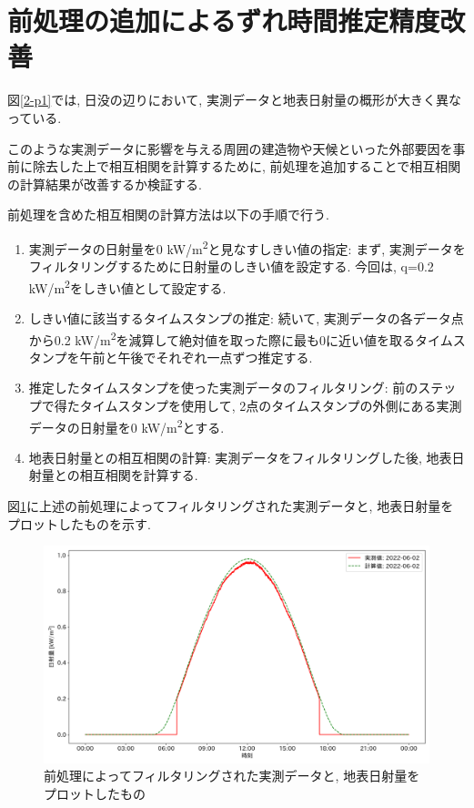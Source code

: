 \section{前処理の追加によるずれ時間推定精度改善}

図\ref{2-p1}では, 日没の辺りにおいて, 実測データと地表日射量の概形が大きく異なっている.

このような実測データに影響を与える周囲の建造物や天候といった外部要因を事前に除去した上で相互相関を計算するために, 前処理を追加することで相互相関の計算結果が改善するか検証する.

前処理を含めた相互相関の計算方法は以下の手順で行う.

\begin{enumerate}
  \item 実測データの日射量を0 \si{\kilo\watt}/\si{\metre\squared}と見なすしきい値の指定: まず, 実測データをフィルタリングするために日射量のしきい値を設定する. 今回は, q=0.2 \si{\kilo\watt}/\si{\metre\squared}をしきい値として設定する.
  \item しきい値に該当するタイムスタンプの推定: 続いて, 実測データの各データ点から0.2 \si{\kilo\watt}/\si{\metre\squared}を減算して絶対値を取った際に最も0に近い値を取るタイムスタンプを午前と午後でそれぞれ一点ずつ推定する.
  \item 推定したタイムスタンプを使った実測データのフィルタリング: 前のステップで得たタイムスタンプを使用して, 2点のタイムスタンプの外側にある実測データの日射量を0 \si{\kilo\watt}/\si{\metre\squared}とする.
  \item 地表日射量との相互相関の計算: 実測データをフィルタリングした後, 地表日射量との相互相関を計算する.
\end{enumerate}

図\ref{2-p2}に上述の前処理によってフィルタリングされた実測データと, 地表日射量をプロットしたものを示す.

\begin{figure}[h]
  \begin{center}
    \includegraphics[width=160mm]{sotu/figure/2/drop-under-0.2-q.png}
    \caption{前処理によってフィルタリングされた実測データと, 地表日射量をプロットしたもの}
    \label{2-p2}
  \end{center}
\end{figure}


